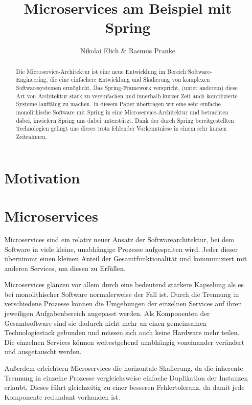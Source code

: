 \documentclass{article}
\author{Nikolai Elich & Rasmus Pranke}
\title{Microservices am Beispiel mit Spring}
\begin{document}
\maketitle

\begin{abstract}
Die Microservice-Architektur ist eine neue Entwicklung im Bereich Software-Engineering, die eine einfachere Entwicklung und Skalierung von komplexen Softwaresystemen ermöglicht.
Das Spring-Framework verspricht, (unter anderem) diese Art von Architektur stark zu vereinfachen und innerhalb kurzer Zeit auch komplizierte Systeme lauffähig zu machen.
In diesem Paper übertragen wir eine sehr einfache monolithische Software mit Spring in eine Microservice-Architektur und betrachten dabei, inwiefern Spring uns dabei unterstützt.
Dank der durch Spring bereitgestellten Technologien gelingt uns dieses trotz fehlender Vorkenntnisse in einem sehr kurzen Zeitrahmen.
\end{abstract}

\pagebreak

\tableofcontents

\pagebreak

\section{Motivation}

\section{Microservices}

Microservices sind ein relativ neuer Ansatz der Softwarearchitektur, bei dem Software in viele kleine, unabhängige Prozesse aufgespalten wird.
Jeder dieser übernimmt einen kleinen Anteil der Gesamtfunktionalität und kommuniziert mit anderen Services, um diesen zu Erfüllen.\cite{OMA}

Microservices glänzen vor allem durch eine bedeutend stärkere Kapselung als es bei monolithischer Software normalerweise der Fall ist.
Durch die Trennung in verschiedene Prozesse können die Umgebungen der einzelnen Services auf ihren jeweiligen Aufgabenbereich angepasst werden.
Als Komponenten der Gesamtsoftware sind sie dadurch nicht mehr an einen gemeinsamen Technologiestack gebunden und müssen sich auch keine Hardware mehr teilen.
Die einzelnen Services können weitestgehend unabhängig voneinander verändert und ausgetauscht werden.\cite{EMMA}

Außerdem erleichtern Microservices die horizontale Skalierung, da die inherente Trennung in einzelne Prozesse vergleichsweise einfache Duplikation der Instanzen erlaubt.
Dieses führt gleichzeitig zu einer besseren Fehlertoleranz, da damit jede Komponente redundant vorhanden ist.\cite{OMA}
\end{document}
